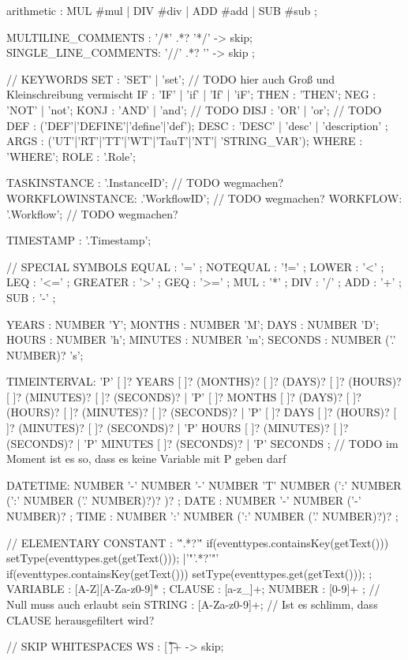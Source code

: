 arithmetic	: MUL 			#mul
			| DIV			#div
			| ADD			#add
			| SUB			#sub
			;

  MULTILINE_COMMENTS  : '/*' .*?  '*/' -> skip;
SINGLE_LINE_COMMENTS: '//' .*? '\n'    -> skip ;

// KEYWORDS
SET		: 'SET' | 'set'; // TODO hier auch Groß und Kleinschreibung vermischt
IF		: 'IF' | 'if' | 'If' | 'iF';
THEN	: 'THEN';
NEG		: 'NOT'  | 'not';
KONJ 	: 'AND' | 'and'; // TODO
DISJ	: 'OR' | 'or'; // TODO
DEF		: ('DEF'|'DEFINE'|'define'|'def');   
DESC	: 'DESC' | 'desc' | 'description' ;
ARGS	: ('UT'|'RT'|'TT'|'WT'|'TauT'|'NT'| 'STRING_VAR');
WHERE	: 'WHERE';
ROLE	: '.Role';

TASKINSTANCE : '.InstanceID'; // TODO wegmachen?
WORKFLOWINSTANCE: .'WorkflowID'; // TODO wegmachen?
WORKFLOW:	'.Workflow'; // TODO wegmachen?


TIMESTAMP : '.Timestamp';

// SPECIAL SYMBOLS
EQUAL   	: '=' ;
NOTEQUAL	: '!=' ;
LOWER		: '<' ;
LEQ			: '<=' ;
GREATER		: '>' ;
GEQ			: '>=' ;
MUL		 	: '*' ;
DIV			: '/' ;
ADD			: '+' ;
SUB			: '-' ;


YEARS 	: NUMBER 'Y';
MONTHS	: NUMBER 'M';
DAYS	: NUMBER 'D';
HOURS	: NUMBER 'h';
MINUTES	: NUMBER 'm';
SECONDS	: NUMBER ('.' NUMBER)? 's';


TIMEINTERVAL: 'P' [ ]? YEARS [ ]? (MONTHS)? [ ]? (DAYS)? [ ]? (HOURS)? 
			[ ]? (MINUTES)? [ ]? (SECONDS)? 
			| 'P' [ ]? MONTHS [ ]? (DAYS)? [ ]? (HOURS)? 
			[ ]? (MINUTES)? [ ]? (SECONDS)? 
			| 'P' [ ]? DAYS [ ]? (HOURS)? 
			[ ]? (MINUTES)? [ ]? (SECONDS)? 
			| 'P' HOURS [ ]? (MINUTES)? [ ]? (SECONDS)? 
			| 'P' MINUTES [ ]? (SECONDS)? 
			| 'P' SECONDS
		 	; // TODO im Moment ist es so, dass es keine Variable mit P geben darf

DATETIME: NUMBER '-' NUMBER '-' NUMBER  'T' NUMBER (':' NUMBER (':' NUMBER ('.' NUMBER)?)? )? ;
DATE	: NUMBER '-' NUMBER ('-' NUMBER)? 	;
TIME	: NUMBER ':' NUMBER (':' NUMBER ('.' NUMBER)?)?  ;

// ELEMENTARY 
CONSTANT 	: '\''.*?'\'' {
	if(eventtypes.containsKey(getText())) {
		setType(eventtypes.get(getText()));
	}}
			|'"'.*?'"' {
	if(eventtypes.containsKey(getText())) {
		setType(eventtypes.get(getText()));
	}}
			;
VARIABLE : [A-Z][A-Za-z0-9]* ; 
CLAUSE	: [a-z_]+;
NUMBER : [0-9]+ ; // Null muss auch erlaubt sein
STRING  : [A-Za-z0-9]+; // Ist es schlimm, dass CLAUSE herausgefiltert wird?


// SKIP WHITESPACES
WS		: [ \t\r\n]+ -> skip;
\fi
  
